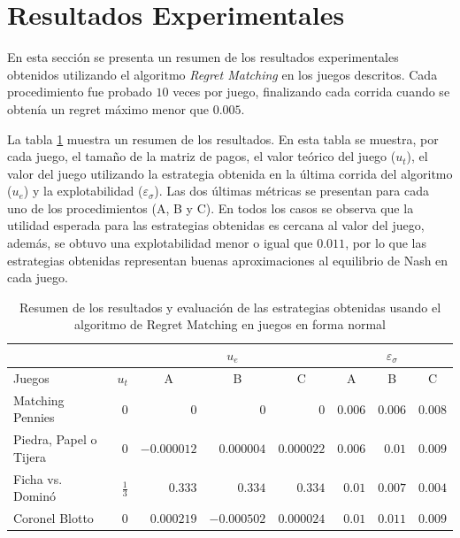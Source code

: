 \section{Resultados Experimentales}

En esta sección se presenta un resumen de los resultados experimentales obtenidos utilizando el algoritmo \textit{Regret Matching} en los juegos descritos. Cada procedimiento fue probado $10$ veces por juego, finalizando cada corrida cuando se obtenía un regret máximo menor que $0.005$.

La tabla \ref{tab:resumen-resultados-RM} muestra un resumen de los resultados. En esta tabla se muestra, por cada juego, el tamaño de la matriz de pagos, el valor teórico del juego ($u_t$), el valor del juego utilizando la estrategia obtenida en la última corrida del algoritmo ($u_e$) y la explotabilidad ($\varepsilon_{\sigma}$). Las dos últimas métricas se presentan para cada uno de los procedimientos (A, B y C). En todos los casos se observa que la utilidad esperada para las estrategias obtenidas es cercana al valor del juego, además, se obtuvo una explotabilidad menor o igual que $0.011$, por lo que las estrategias obtenidas representan buenas aproximaciones al equilibrio de Nash en cada juego.

\begin{table}[htpb]
    \centering
    \begin{tabular}{l|r|r r r|r r r}
        \multicolumn{2}{c}{} & \multicolumn{3}{c}{$u_e$} & \multicolumn{3}{c}{$\varepsilon_{\sigma}$}  \\ \hline
        Juegos & $u_t$ & \multicolumn{1}{|c}{A} & \multicolumn{1}{c}{B} & \multicolumn{1}{c|}{C}
          & \multicolumn{1}{|c}{A} & \multicolumn{1}{c}{B} & \multicolumn{1}{c}{C} \\ \hline
        Matching Pennies
            & $0$ & $0$ & $0$ & $0$ & $0.006$ & $0.006$ & $0.008$ \\
        Piedra, Papel o Tijera
            & $0$ & $-0.000012$ & $0.000004$ & $0.000022$ & $0.006$ & $0.01$ & $0.009$ \\
        Ficha vs. Dominó
            & $\frac{1}{3}$ & $0.333$ & $0.334$ & $0.334$ & $0.01$ & $0.007$ & $0.004$ \\
        Coronel Blotto
            & $0$ & $0.000219$ & $-0.000502$ & $0.000024$ & $0.01$ & $0.011$ & $0.009$ \\
        \hline
    \end{tabular}
    \caption{Resumen de los resultados y evaluación de las estrategias obtenidas usando el algoritmo de Regret Matching en juegos en forma normal}
    \label{tab:resumen-resultados-RM}
\end{table}

